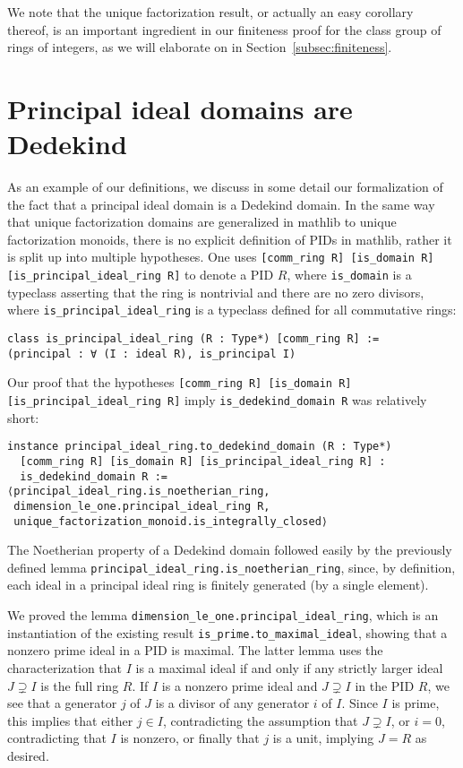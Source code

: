 \documentclass[sn-mathphys]{sn-jnl}%
\newcommand{\lean}[1]{\texttt{#1}\xspace}
\newcommand{\mathlib}{\textsf{mathlib}\xspace}
\begin{document}
We note that the unique factorization result, or actually an easy corollary thereof, is an important ingredient in our finiteness proof for the class group of rings of integers, as we will elaborate on in Section~\ref{subsec:finiteness}.

\section{Principal ideal domains are Dedekind}

As an example of our definitions, we discuss in some detail our formalization of the fact that a principal ideal domain is a Dedekind domain.
In the same way that unique factorization domains are generalized in \mathlib to unique factorization monoids,
there is no explicit definition of PIDs in \mathlib, rather it is split up into multiple hypotheses.
One uses \lean{[comm\_ring R] [is\_domain R] [is\_principal\_ideal\_ring R]} to denote a PID $R$,
where \lean{is\_domain} is a typeclass asserting that the ring is nontrivial and there are no zero divisors,
where \lean{is\_principal\_\-ideal\_\-ring} is a typeclass defined for all commutative rings:
\begin{lstlisting}
class is_principal_ideal_ring (R : Type*) [comm_ring R] :=
(principal : ∀ (I : ideal R), is_principal I)
\end{lstlisting}

Our proof that the hypotheses \lean{[comm\_ring R] [is\_domain R] [is\_principal\_\-ideal\_\-ring R]} imply \lean{is\_dedekind\_domain R} was relatively short:
\begin{lstlisting}
instance principal_ideal_ring.to_dedekind_domain (R : Type*)
  [comm_ring R] [is_domain R] [is_principal_ideal_ring R] :
  is_dedekind_domain R :=
⟨principal_ideal_ring.is_noetherian_ring,
 dimension_le_one.principal_ideal_ring R,
 unique_factorization_monoid.is_integrally_closed⟩
\end{lstlisting}

The Noetherian property of a Dedekind domain followed easily by the previously defined lemma \lean{principal\_ideal\_ring.is\_noetherian\_ring}, since, by definition, each ideal in a principal ideal ring is finitely generated (by a single element).

We proved the lemma \lean{dimension\_le\_one.principal\_ideal\_ring}, which is an instantiation of the existing result \lean{is\_prime.to\_maximal\_ideal}, showing that a nonzero prime ideal in a PID is maximal.
The latter lemma uses the characterization that $I$ is a maximal ideal if and only if any strictly larger ideal $J\supsetneq I$ is the full ring $R$.
If $I$ is a nonzero prime ideal and $J \supsetneq I$ in the PID $R$, we see that a generator $j$ of $J$ is a divisor of any generator $i$ of $I$. Since $I$ is prime, this implies that either $j \in I$, contradicting the assumption that $J \supsetneq I$, or $i = 0$, contradicting that $I$ is nonzero, or finally that $j$ is a unit, implying $J = R$ as desired.
\end{document}
